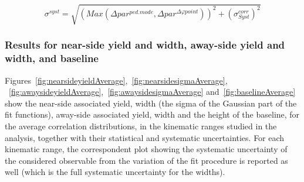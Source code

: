 \begin{equation}
\sigma^{syst} = \sqrt{\left(Max\left(\Delta par^{ped.mode},\Delta par^{\Delta\varphi point}\right)\right)^{2} + (\sigma_{Syst}^{corr})^{2}}
\end{equation}

\subsubsection{Results for near-side yield and width, away-side yield and width, and baseline}

Figures~\ref{fig:nearsideyieldAverage},~\ref{fig:nearsidesigmaAverage}, ~\ref{fig:awaysideyieldAverage},~\ref{fig:awaysidesigmaAverage} and~\ref{fig:baselineAverage} show the near-side associated yield, width (the sigma of the Gaussian part of the fit functions), away-side associated yield, width and the height of the baseline, for the average correlation distributions, in the kinematic ranges studied in the analysis, together with their statistical and systematic uncertainties. For each kinematic range, the correspondent plot showing the systematic uncertainty of the considered observable from the variation of the fit procedure is reported as well (which is the full systematic uncertainty for the widths).


%



